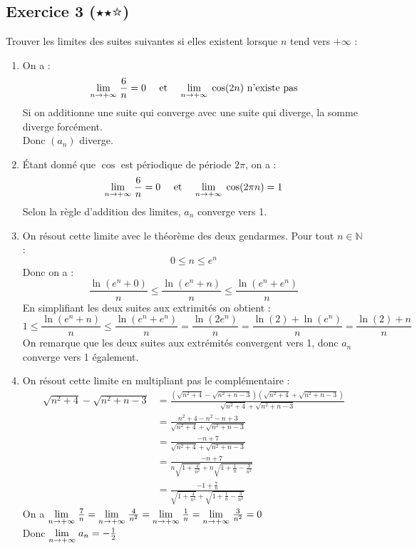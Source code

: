 \documentclass{article}
\newcommand{\Lim}[1]{\raisebox{0.0ex}{\scalebox{1}{$\displaystyle \lim_{#1}\;$}}}
\begin{document}
\subsection{Exercice 3 ($\medblackstar \medblackstar \medwhitestar$)}

Trouver les limites des suites suivantes si elles existent lorsque $n$ tend vers $+\infty$ :

\begin{enumerate}
    \item On a : $$\Lim{n \to + \infty} \frac{6}{n} = 0 \quad \mbox{ et } \quad \Lim{n \to + \infty} \cos(2 n) \mbox{ n'existe pas}$$
    Si on additionne une suite qui converge avec une suite qui diverge, la somme diverge forcément.\\
    Donc $(a_n)$ diverge.
    \item Étant donné que $\cos$ est périodique de période $2\pi$, on a : $$\Lim{n \to + \infty} \frac{6}{n} = 0 \quad \mbox{ et } \quad \Lim{n \to + \infty} \cos(2\pi n) = 1$$
    Selon la règle d'addition des limites, $a_n$ converge vers 1.
    \item On résout cette limite avec le théorème des deux gendarmes.
    Pour tout $n \in \mathbb{N}$ :
    $$0 \leq n \leq e^n$$
    Donc on a :
    $$\frac{\ln(e^n + 0)}{n} \leq \frac{\ln(e^n + n)}{n} \leq \frac{\ln(e^n + e^n)}{n}$$
    En simplifiant les deux suites aux extrimités on obtient :
    $$1 \leq \frac{\ln(e^n + n)}{n} \leq \frac{\ln(e^n + e^n)}{n} =\frac{\ln(2e^n)}{n}= \frac{\ln(2) + \ln(e^n)}{n} = \frac{\ln(2) + n}{n}$$
    On remarque que les deux suites aux extrémités convergent vers 1, donc $a_n$ converge vers 1 également.
    \item On résout cette limite en multipliant pas le complémentaire :
    \begin{align*}
        \sqrt{n^2 + 4} - \sqrt{n^2 +n - 3} &= \frac{(\sqrt{n^2 + 4} - \sqrt{n^2 +n - 3})(\sqrt{n^2 + 4} + \sqrt{n^2 +n - 3})}{\sqrt{n^2 + 4} + \sqrt{n^2 +n - 3}}\\
        &= \frac{n^2 + 4 - n^2 - n + 3}{\sqrt{n^2 + 4} + \sqrt{n^2 +n - 3}}\\
        &= \frac{- n + 7}{\sqrt{n^2 + 4} + \sqrt{n^2 +n - 3}}\\
        &= \frac{- n + 7}{n\sqrt{1 + \frac{4}{n^2}} + n\sqrt{1 + \frac{1}{n} - \frac{3}{n^2}}}\\
        &= \frac{- 1 + \frac{7}{n}}{\sqrt{1 + \frac{4}{n^2}} + \sqrt{1 + \frac{1}{n} - \frac{3}{n^2}}}
    \end{align*}
    On a $\Lim{n \to + \infty} \frac{7}{n} = \Lim{n \to + \infty} \frac{4}{n^2} = \Lim{n \to + \infty} \frac{1}{n} = \Lim{n \to + \infty} \frac{3}{n^2} = 0$\\
    Donc $\Lim{n \to + \infty} a_n = -\frac{1}{2}$
\end{enumerate}
\end{document}
